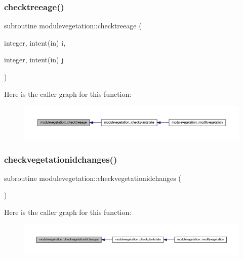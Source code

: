\subsubsection{\texorpdfstring{checktreeage()}{checktreeage()}}
{\footnotesize\ttfamily subroutine modulevegetation\+::checktreeage (\begin{DoxyParamCaption}\item[{integer, intent(in)}]{i,  }\item[{integer, intent(in)}]{j }\end{DoxyParamCaption})\hspace{0.3cm}{\ttfamily [private]}}

Here is the caller graph for this function\+:\nopagebreak
\begin{figure}[H]
\begin{center}
\leavevmode
\includegraphics[width=350pt]{namespacemodulevegetation_adc2f366c1b31fc9c591f3d3be221f677_icgraph}
\end{center}
\end{figure}
\mbox{\label{namespacemodulevegetation_af6b014e82fcb0998befe6b8a12f66de3}} 
\subsubsection{\texorpdfstring{checkvegetationidchanges()}{checkvegetationidchanges()}}
{\footnotesize\ttfamily subroutine modulevegetation\+::checkvegetationidchanges (\begin{DoxyParamCaption}{ }\end{DoxyParamCaption})\hspace{0.3cm}{\ttfamily [private]}}

Here is the caller graph for this function\+:\nopagebreak
\begin{figure}[H]
\begin{center}
\leavevmode
\includegraphics[width=350pt]{namespacemodulevegetation_af6b014e82fcb0998befe6b8a12f66de3_icgraph}
\end{center}
\end{figure}
\mbox{\label{namespacemodulevegetation_a5a2c8672adf25c28f58c08cd7f76e1c6}} 
